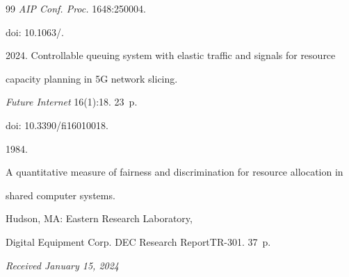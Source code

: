 {{\begin{thebibliography}{99}
\textit{AIP Conf. Proc.} 1648:250004.


doi: 10.1063\!/.









2024. Controllable queuing system with elastic traffic and signals for resource 


capacity planning in 5G network slicing.


\textit{Future Internet} 16(1):18. 23~p.


doi: 10.3390\!/\!fi16010018.












1984.


A quantitative measure of fairness and discrimination for resource allocation in 


shared computer systems.


 Hudson, MA: Eastern Research Laboratory, 


Digital Equipment Corp. DEC Research Report\linebreak TR-301. 37~p.





\end{thebibliography}


} }





\vspace*{-6pt}





\hfill{\small\textit{Received January 15, 2024}} 





\vspace*{-14pt} 





\Contr





\vspace*{-3pt}






